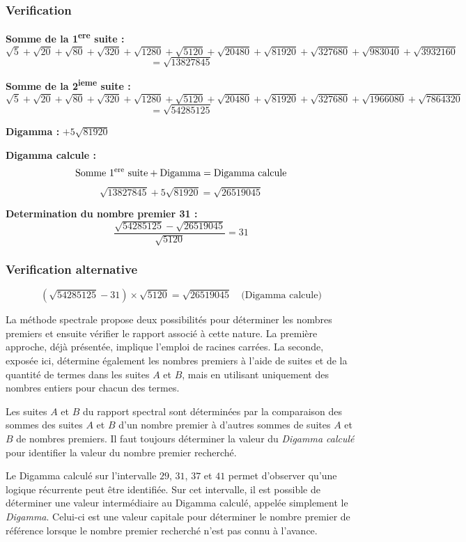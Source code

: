 \documentclass[a4paper,11pt]{article}
\begin{document}
\subsubsection{Verification}

\textbf{Somme de la 1\textsuperscript{ere} suite :}
\[
\sqrt{5} + \sqrt{20} + \sqrt{80} + \sqrt{320} + \sqrt{1280} + \sqrt{5120} + \sqrt{20480} + \sqrt{81920} + \sqrt{327680} + \sqrt{983040} + \sqrt{3932160}
\]
\[
= \sqrt{13827845}
\]

\textbf{Somme de la 2\textsuperscript{ieme} suite :}
\[
\sqrt{5} + \sqrt{20} + \sqrt{80} + \sqrt{320} + \sqrt{1280} + \sqrt{5120} + \sqrt{20480} + \sqrt{81920} + \sqrt{327680} + \sqrt{1966080} + \sqrt{7864320}
\]
\[
= \sqrt{54285125}
\]

\textbf{Digamma :} $+5\sqrt{81920}$

\textbf{Digamma calcule :}
\[
\text{Somme 1\textsuperscript{ere} suite} + \text{Digamma} = \text{Digamma calcule}
\]
\[
\sqrt{13827845} + 5\sqrt{81920} = \sqrt{26519045}
\]

\textbf{Determination du nombre premier 31 :}
\[
\frac{\sqrt{54285125} - \sqrt{26519045}}{\sqrt{5120}} = 31
\]

\subsubsection{Verification alternative}
\[
(\sqrt{54285125} - 31) \times \sqrt{5120} = \sqrt{26519045} \quad \text{(Digamma calcule)}
\]

La méthode spectrale propose deux possibilités pour déterminer les nombres premiers et ensuite vérifier le rapport associé à cette nature. La première approche, déjà présentée, implique l'emploi de racines carrées. La seconde, exposée ici, détermine également les nombres premiers à l'aide de suites et de la quantité de termes dans les suites $A$ et $B$, mais en utilisant uniquement des nombres entiers pour chacun des termes.

Les suites $A$ et $B$ du rapport spectral sont déterminées par la comparaison des sommes des suites $A$ et $B$ d'un nombre premier à d'autres sommes de suites $A$ et $B$ de nombres premiers. Il faut toujours déterminer la valeur du \emph{Digamma calculé} pour identifier la valeur du nombre premier recherché.

Le Digamma calculé sur l'intervalle $29$, $31$, $37$ et $41$ permet d'observer qu'une logique récurrente peut être identifiée. Sur cet intervalle, il est possible de déterminer une valeur intermédiaire au Digamma calculé, appelée simplement le \emph{Digamma}. Celui-ci est une valeur capitale pour déterminer le nombre premier de référence lorsque le nombre premier recherché n'est pas connu à l'avance.
\end{document}
